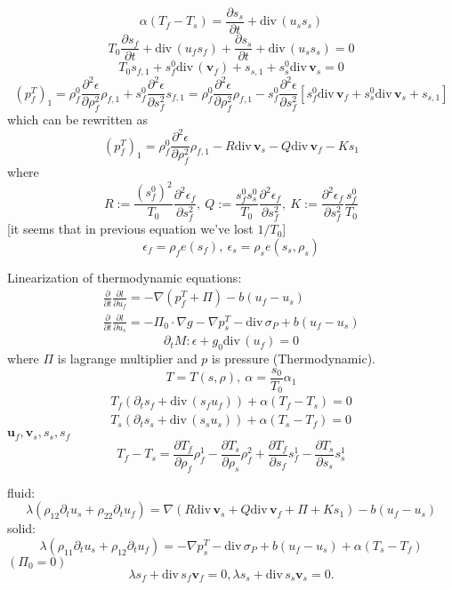 \documentclass[12pt]{article}
\numberwithin{theorem}{section}
\def\div{\mbox{div}\,}
\begin{document}
\[\alpha(T_f-T_s) = \frac{\partial s_s}{\partial t} + \div(u_ss_s)\]
\[T_0 \frac{\partial s_f}{\partial t}+\div(u_fs_f)+\frac{\partial s_s}{\partial t} + \div(u_ss_s)=0\]
\[T_0 s_{f,1}+s^0_f\div(\mathbf{v}_f) + s_{s,1}+s^0_s\div\mathbf{v}_s = 0\]
\[(p^T_f)_1 = \rho_f^0 \frac{\partial^2 \epsilon}{\partial \rho^2_f}\rho_{f,1}+s^0_f\frac{\partial^2 \epsilon}{\partial s^2_f}s_{f,1}=
\rho_f^0 \frac{\partial^2 \epsilon}{\partial \rho^2_f}\rho_{f,1}-s^0_f\frac{\partial^2 \epsilon}{\partial s^2_f}[s^0_f\div\mathbf{v}_f+s^0_s\div\mathbf{v}_s+s_{s,1}]\]
which can be rewritten as
\[(p^T_f)_1 = \rho_f^0 \frac{\partial^2 \epsilon}{\partial \rho^2_f}\rho_{f,1}-R\div\mathbf{v}_s - Q\div\mathbf{v}_f - Ks_1\] where
\[R:=\frac{(s^0_f)^2}{T_0}\frac{\partial^2 \epsilon_f}{\partial s_f^2},\ Q:=\frac{s^0_fs^0_s}{T_0}\frac{\partial^2 \epsilon_f}{\partial s^2_f},\ K:=\frac{\partial^2\epsilon_f}{\partial s^2_f}\frac{s_f^0}{T_0}\]
[it seems that in previous equation we've lost $1/T_0$]
\[\epsilon_f = \rho_fe(s_f),\ \epsilon_s=\rho_se(s_s,\rho_s)\]

Linearization of thermodynamic equations:
\[\begin{array}{l}
\frac\partial{\partial t}\frac{\partial l}{\partial u_f} = -\nabla(p^T_f + \Pi) - b(u_f-u_s) \\
\frac\partial{\partial t}\frac{\partial l}{\partial u_s} = -\Pi_0 \cdot \nabla g - \nabla p^T_s - \div \sigma_P + b(u_f-u_s)
\end{array}\]
\[\partial_t M:\epsilon + g_0 \div ( u_f)=0\]
where $\Pi$ is lagrange multiplier and $p$ is pressure (Thermodynamic).
\[T = T(s,\rho), \ \alpha=\frac{s_0}{T_0}\alpha_1\]
\[\begin{array}{l}
T_f (\partial_t s_f + \div(s_fu_f)) + \alpha(T_f-T_s) =0 \\
T_s (\partial_t s_s + \div(s_su_s)) + \alpha(T_s-T_f) =0
\end{array}\]
$\mathbf{u}_f, \mathbf{v}_s, s_s, s_f$
\[T_f - T_s = 
\frac{\partial T_f}{\partial \rho_f}\rho_f^1
-\frac{\partial T_s}{\partial \rho_s}\rho_f^2
+\frac{\partial T_f}{\partial s_f}s_f^1
-\frac{\partial T_s}{\partial s_s}s_s^1\]

fluid:
\[\lambda (\rho_{12}\partial_t u_s + \rho_{22}\partial_t u_f) = \nabla(R\div \mathbf{v}_s + Q \div\mathbf{v}_f + \Pi + Ks_1) - b(u_f-u_s)\]
solid:
\[\lambda (\rho_{11}\partial_t u_s + \rho_{12}\partial_t u_f) = -\nabla p_s^T - \div\sigma_P + b (u_f - u_s) + \alpha(T_s-T_f)\]
$(\Pi_0 = 0)$
\[\lambda s_f + \div s_f\mathbf{v}_f =0, \lambda s_s + \div s_s\mathbf{v}_s =0.\]
\end{document}
